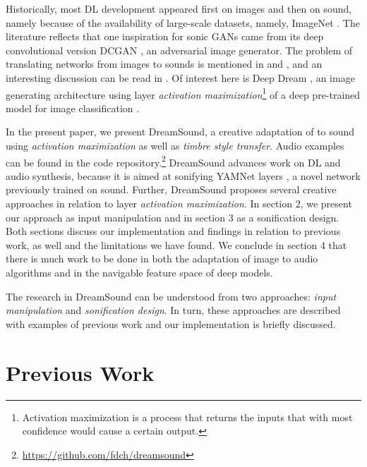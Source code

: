 \documentclass[a4paper,10pt,oneside]{article}
\begin{document}
\begin{sloppy}
Historically, most DL development appeared first on images and then on sound, namely because of the availability of large-scale datasets, namely, ImageNet \cite{ILSVRC15}. The literature reflects that one inspiration for sonic GANs came from its deep convolutional version DCGAN \cite{radford2015unsupervised}, an adversarial image generator. The problem of translating networks from images to sounds is mentioned in \cite{RothmanBlog} and \cite{2019Purwins}, and an interesting discussion can be read in \cite{Briot2017}. Of interest here is Deep Dream \cite{Mordvintsev2015}, an image generating architecture using layer \textit{activation maximization}\footnote{Activation maximization is a process that returns the inputs that with most confidence would cause a certain output.} of a deep pre-trained model for image classification \cite{szegedy2014going}. 

In the present paper, we present DreamSound, a creative adaptation of \cite{Mordvintsev2015} to sound using \textit{activation maximization} as well as \textit{timbre style transfer}. Audio examples can be found in the code repository.\footnote{\url{https://github.com/fdch/dreamsound}} DreamSound advances work on DL and audio synthesis, because it is aimed at sonifying YAMNet layers \cite{YamNet2020}, a novel network previously trained on sound. Further, DreamSound proposes several creative approaches in relation to layer \textit{activation maximization}. In section 2, we present our approach as input manipulation and in section 3 as a sonification design. Both sections discuss our implementation and findings in relation to previous work, as well and the limitations we have found. We conclude in section 4 that there is much work to be done in both the adaptation of image to audio algorithms and in the navigable feature space of deep models.

The research in DreamSound can be understood from two approaches: \textit{input manipulation} and \textit{sonification design}. In turn, these approaches are described with examples of previous work and our implementation is briefly discussed.

\section{Previous Work}


\end{sloppy}
\end{document}
